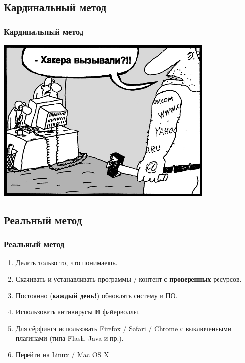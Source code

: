 \documentclass[compress,red]{beamer}
\begin{document}
\subsection{Кардинальный метод}
\begin{frame}
  \frametitle{Кардинальный метод}
  \centerline{\includegraphics[width=0.8\textwidth]{images/WhatToDo.jpg}}
\end{frame}

\subsection{Реальный метод}
\begin{frame}
  \frametitle{Реальный метод}
  \begin{enumerate}[<+->]
    \item Делать только то, что понимаешь.
    \item Скачивать и устанавливать программы / контент с \textbf{проверенных} ресурсов.
    \item Постоянно (\textbf{каждый день!}) обновлять систему и ПО.
    \item Использовать антивирусы \textbf{И} файерволлы.
    \item Для сёрфинга использовать Firefox / Safari / Chrome с выключенными плагинами (типа Flash, Java и пр.).
    \item Перейти на Linux / Mac OS X
  \end{enumerate}
\end{frame}
\end{document}
